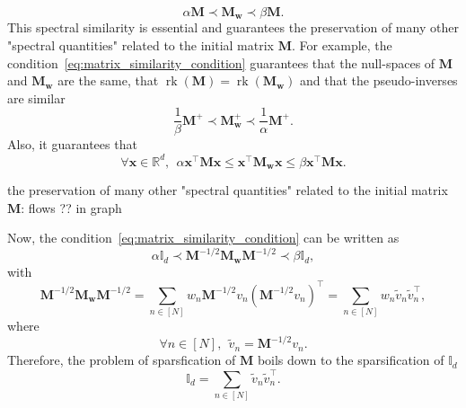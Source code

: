 \documentclass[twoside,11pt]{book}
\numberwithin{theorem}{chapter}
\numberwithin{definition}{chapter}
\numberwithin{proposition}{chapter}
\numberwithin{corollary}{chapter}
\numberwithin{example}{chapter}
\numberwithin{lemma}{chapter}
\numberwithin{assumption}{chapter}
\DeclareMathOperator{\rank}{\mathrm{rk}}
\DeclareMathOperator{\Tran}{\intercal}
\begin{document}
\begin{equation}\label{eq:matrix_similarity_condition}
\alpha \bm{M} \prec \bm{M}_{\bm{w}} \prec \beta \bm{M}.
\end{equation}
This spectral similarity is essential 
and guarantees the preservation of many other "spectral quantities" related to the initial matrix $\bm{M}$. For example, the condition~\eqref{eq:matrix_similarity_condition} guarantees that the null-spaces of $\bm{M}$ and $\bm{M}_{\bm{w}}$ are the same, that $\rank(\bm{M}) = \rank(\bm{M}_{\bm{w}})$ and that the pseudo-inverses are similar \citep{MiAk77}
\begin{equation}
\frac{1}{\beta} \bm{M}^{+} \prec \bm{M}_{\bm{w}}^{+} \prec \frac{1}{\alpha} \bm{M}^{+}.
\end{equation}
Also, it guarantees that 
\begin{equation}
\forall \bm{x} \in \mathbb{R}^{d}, \:\:
\alpha \bm{x}^{\Tran}\bm{M}\bm{x} \leq \bm{x}^{\Tran}\bm{M}_{\bm{w}}\bm{x} \leq \beta \bm{x}^{\Tran}\bm{M}\bm{x}.
\end{equation}

the preservation of many other "spectral quantities" related to the initial matrix $\bm{M}$: flows ?? in graph 





Now, the condition~\eqref{eq:matrix_similarity_condition} can be written as
\begin{equation}
\alpha \mathbb{I}_{d} \prec \bm{M}^{-1/2}\bm{M}_{\bm{w}} \bm{M}^{-1/2} \prec \beta \mathbb{I}_{d},
\end{equation}
with
\begin{equation}
 \bm{M}^{-1/2}\bm{M}_{\bm{w}} \bm{M}^{-1/2}  = \sum\limits_{n \in [N]} w_{n} \bm{M}^{-1/2} v_{n} (\bm{M}^{-1/2} v_{n})^{\Tran} = \sum\limits_{n \in [N]} w_{n} \tilde{v}_{n} \tilde{v}_{n}^{\Tran},
\end{equation}
where
\begin{equation}
\forall n \in [N], \:\:\tilde{v}_{n} = \bm{M}^{-1/2} v_{n}.
\end{equation}
Therefore, the problem of sparsfication of $\bm{M}$ boils down to the sparsification of $\mathbb{I}_{d}$
\begin{equation}\label{eq:sum_to_identity}
\mathbb{I}_{d} = \sum\limits_{n \in [N]}\tilde{v}_{n}\tilde{v}_{n}^{\Tran}.
\end{equation}
\end{document}
